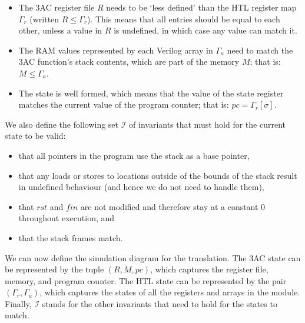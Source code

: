 \begin{itemize}
\item The 3AC register file $R$ needs to be `less defined' than the HTL register
  map $\Gamma_{r}$ (written $R \le \Gamma_{r}$). This means that all entries
  should be equal to each other, unless a value in $R$ is undefined, in which
  case any value can match it.
\item The RAM values represented by each Verilog array in $\Gamma_{a}$ need to
  match the 3AC function's stack contents, which are part of the memory $M$;
  that is: $M \le \Gamma_{a}$.
\item The state is well formed, which means that the value of the state register
  matches the current value of the program counter; that is:
  $\mathit{pc} = \Gamma_{r}[\sigma]$.
\end{itemize}

We also define the following set $\mathcal{I}$ of invariants that must hold for
the current state to be valid:

\begin{itemize}
\item that all pointers in the program use the stack as a base pointer,
\item that any loads or stores to locations outside of the bounds of the stack
  result in undefined behaviour (and hence we do not need to handle them),
\item that $\mathit{rst}$ and $\mathit{fin}$ are not modified and therefore stay
  at a constant 0 throughout execution, and
\item that the stack frames match.
\end{itemize}

We can now define the simulation diagram for the translation. The 3AC state can
be represented by the tuple $(R,M,\mathit{pc})$, which captures the register
file, memory, and program counter. The HTL state can be represented by the pair
$(\Gamma_{r}, \Gamma_{a})$, which captures the states of all the registers and
arrays in the module.  Finally, $\mathcal{I}$ stands for the other invariants
that need to hold for the states to match.


